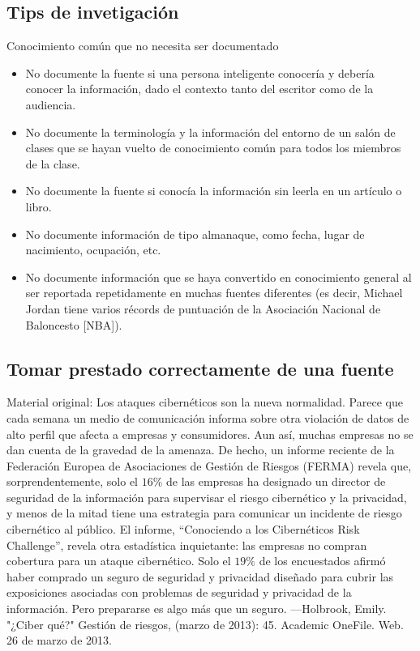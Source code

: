  \subsection*{Tips de invetigación}
 Conocimiento común que no necesita ser documentado 
\begin{itemize}
    \item No documente la fuente si una persona inteligente conocería y debería conocer la información, dado el contexto tanto del escritor como de la audiencia. 
    \item No documente la terminología y la información del entorno de un salón de clases que se hayan vuelto de conocimiento común para todos los miembros de la clase. 
    \item No documente la fuente si conocía la información sin leerla en un artículo o libro.
    \item No documente información de tipo almanaque, como fecha, lugar de nacimiento, ocupación, etc. 
    \item No documente información que se haya convertido en conocimiento general al ser reportada repetidamente en muchas fuentes diferentes (es decir, Michael Jordan tiene varios récords de puntuación de la Asociación Nacional de Baloncesto [NBA]).
\end{itemize}

\subsection{Tomar prestado correctamente de una fuente}
Material original: Los ataques cibernéticos son la nueva normalidad. Parece que cada semana un medio de comunicación informa sobre otra violación de datos de alto perfil que afecta a empresas y consumidores. Aun así, muchas empresas no se dan cuenta de la gravedad de la amenaza. De hecho, un informe reciente de la Federación Europea de Asociaciones de Gestión de Riesgos (FERMA) revela que, sorprendentemente, solo el $16 \%$ de las empresas ha designado un director de seguridad de la información para supervisar el riesgo cibernético y la privacidad, y menos de la mitad tiene una estrategia para comunicar un incidente de riesgo cibernético al público. El informe, “Conociendo a los Cibernéticos Risk Challenge”, revela otra estadística inquietante: las empresas no compran cobertura para un ataque cibernético. Solo el $19\%$ de los encuestados afirmó haber comprado un seguro de seguridad y privacidad diseñado para cubrir las exposiciones asociadas con problemas de seguridad y privacidad de la información. Pero prepararse es algo más que un seguro. —Holbrook, Emily. "¿Ciber qué?" Gestión de riesgos, (marzo de 2013): 45. Academic OneFile. Web. 26 de marzo de 2013.\\

